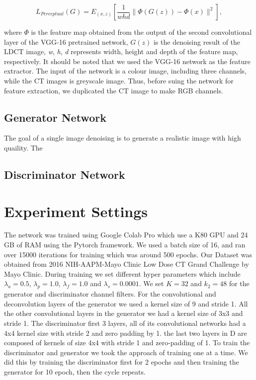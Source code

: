 \documentclass[journal]{IEEEtran}
\begin{document}
\begin{equation}
	L_{Perceptual}(G) = E_{(x,z)}\left[ \frac{1}{whd}\|\Phi(G(z))-\Phi(x)\|^2 \right],
\end{equation}

	where $\Phi$ is the feature map obtained from the output of the second convolutional layer of the VGG-16 pretrained network, $G(z)$ is the denoising result of the LDCT image, \emph{w}, \emph{h}, \emph{d} represents width, height and depth of the feature map, respectively.  It should be noted that we used the VGG-16 network as the feature extractor.  The input of the network is a colour image, including three channels, while the CT images is greyscale image.  Thus, before suing the network for feature extraction, we duplicated the CT image to make RGB channels.

\subsection{Generator Network}
\label{generator}
The goal of a single image denoising is to generate a realistic image with high quaility.  The 

\subsection{Discriminator Network}
\label{discriminator}


\section{Experiment Settings}
\label{experiment settings}
The network was trained using Google Colab Pro which use a K80 GPU and 24 GB of RAM using the Pytorch framework. We used a batch size of 16,  and ran over 15000 iterations for training which was around 500 epochs.  Our Dataset was obtained from 2016 NIH-AAPM-Mayo Clinic Low Dose CT Grand Challenge by Mayo Clinic.  During training we set different hyper parameters which include $\lambda_a=0.5$, $\lambda_p=1.0$, $\lambda_f=1.0$ and $\lambda_s=0.0001$. We set $K=32$ and $k_2=48$ for the generator and discriminator channel filters.  For the convolutional and deconvolution layers of the generator we used a kernel size of 9 and stride 1.  All the other convolutional layers in the generator we had a kernel size of 3x3 and stride 1.   The discriminator first 3 layers, all of its convolutional networks had a 4x4 kernel size with stride 2 and zero padding by 1.  the last two layers in D are composed of kernels of size 4x4 with stride 1 and zero-padding of 1. To train the discriminator and generator we took the approach of training one at a time.  We did this by training the discriminator first for 2 epochs and then training the generator for 10 epoch, then the cycle repeats.  
\end{document}
